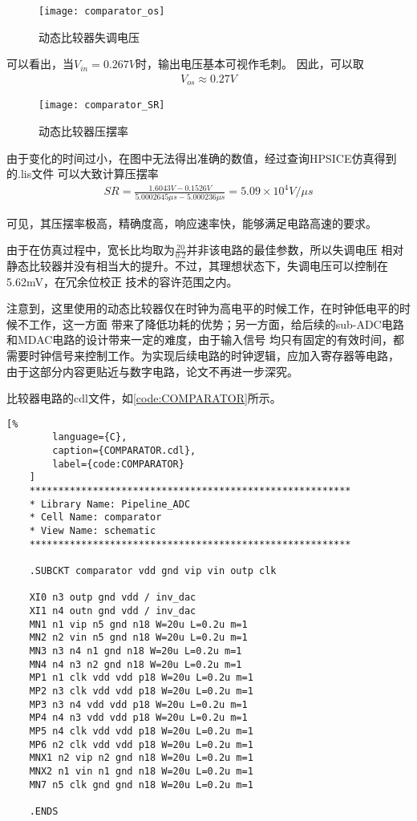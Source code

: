     \begin{figure}[H]
        \centering
        \texttt{[image: comparator\_os]}
        \caption{\label{fig:comparator_os}动态比较器失调电压}
    \end{figure}
    \par 可以看出，当$ V_{in} = 0.267V $时，输出电压基本可视作毛刺。
    因此，可以取
    \begin{align}
        V_{os} \approx 0.27V
    \end{align}
    \begin{figure}[H]
        \centering
        \texttt{[image: comparator\_SR]}
        \caption{\label{fig:comparator_SR}动态比较器压摆率}
    \end{figure}
    \par 由于变化的时间过小，在图中无法得出准确的数值，经过查询HPSICE仿真得到的.lis文件
    可以大致计算压摆率
    \begin{align}
        SR = \frac{1.6043V-0.1526V}{5.0002645\mu s-5.000236\mu s} = 5.09\times10^{4}V/\mu s
    \end{align}
    \par 可见，其压摆率极高，精确度高，响应速率快，能够满足电路高速的要求。
    \par 由于在仿真过程中，宽长比均取为$ \frac{20}{0.2} $并非该电路的最佳参数，所以失调电压
    相对静态比较器并没有相当大的提升。不过，其理想状态下，失调电压可以控制在5.62mV，在冗余位校正
    技术的容许范围之内。
    \par 注意到，这里使用的动态比较器仅在时钟为高电平的时候工作，在时钟低电平的时候不工作，这一方面
    带来了降低功耗的优势；另一方面，给后续的sub-ADC电路和MDAC电路的设计带来一定的难度，由于输入信号
    均只有固定的有效时间，都需要时钟信号来控制工作。为实现后续电路的时钟逻辑，应加入寄存器等电路，
    由于这部分内容更贴近与数字电路，论文不再进一步深究。

    \par 比较器电路的cdl文件，如\autoref{code:COMPARATOR}所示。
    \begin{lstlisting}[%
        language={C},
        caption={COMPARATOR.cdl},
        label={code:COMPARATOR}
    ]
    ********************************************************
    * Library Name: Pipeline_ADC
    * Cell Name: comparator
    * View Name: schematic
    ********************************************************

    .SUBCKT comparator vdd gnd vip vin outp clk

    XI0 n3 outp gnd vdd / inv_dac
    XI1 n4 outn gnd vdd / inv_dac
    MN1 n1 vip n5 gnd n18 W=20u L=0.2u m=1
    MN2 n2 vin n5 gnd n18 W=20u L=0.2u m=1
    MN3 n3 n4 n1 gnd n18 W=20u L=0.2u m=1
    MN4 n4 n3 n2 gnd n18 W=20u L=0.2u m=1
    MP1 n1 clk vdd vdd p18 W=20u L=0.2u m=1
    MP2 n3 clk vdd vdd p18 W=20u L=0.2u m=1
    MP3 n3 n4 vdd vdd p18 W=20u L=0.2u m=1
    MP4 n4 n3 vdd vdd p18 W=20u L=0.2u m=1
    MP5 n4 clk vdd vdd p18 W=20u L=0.2u m=1
    MP6 n2 clk vdd vdd p18 W=20u L=0.2u m=1
    MNX1 n2 vip n2 gnd n18 W=20u L=0.2u m=1
    MNX2 n1 vin n1 gnd n18 W=20u L=0.2u m=1
    MN7 n5 clk gnd gnd n18 W=20u L=0.2u m=1

    .ENDS
    \end{lstlisting}



